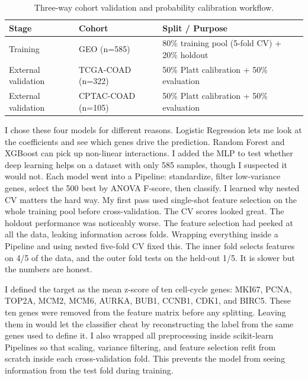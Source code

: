 \documentclass[11pt]{article}
\begin{document}
\begin{table}[H]
\centering
\caption{Three-way cohort validation and probability calibration workflow.}
\begin{tabular}{lll}
\toprule
\textbf{Stage} & \textbf{Cohort} & \textbf{Split / Purpose} \\
\midrule
Training & GEO (n=585) & 80\% training pool (5-fold CV) + 20\% holdout \\
External validation & TCGA-COAD (n=322) & 50\% Platt calibration + 50\% evaluation \\
External validation & CPTAC-COAD (n=105) & 50\% Platt calibration + 50\% evaluation \\
\bottomrule
\end{tabular}
\end{table}

I chose these four models for different reasons. Logistic Regression lets me look at the coefficients and see which genes drive the prediction. Random Forest and XGBoost can pick up non-linear interactions. I added the MLP to test whether deep learning helps on a dataset with only 585 samples, though I suspected it would not. Each model went into a Pipeline: standardize, filter low-variance genes, select the 500 best by ANOVA F-score, then classify. I learned why nested CV matters the hard way. My first pass used single-shot feature selection on the whole training pool before cross-validation. The CV scores looked great. The holdout performance was noticeably worse. The feature selection had peeked at all the data, leaking information across folds. Wrapping everything inside a Pipeline and using nested five-fold CV fixed this. The inner fold selects features on 4/5 of the data, and the outer fold tests on the held-out 1/5. It is slower but the numbers are honest.

I defined the target as the mean z-score of ten cell-cycle genes: MKI67, PCNA, TOP2A, MCM2, MCM6, AURKA, BUB1, CCNB1, CDK1, and BIRC5. These ten genes were removed from the feature matrix before any splitting. Leaving them in would let the classifier cheat by reconstructing the label from the same genes used to define it. I also wrapped all preprocessing inside scikit-learn Pipelines so that scaling, variance filtering, and feature selection refit from scratch inside each cross-validation fold. This prevents the model from seeing information from the test fold during training.
\end{document}
